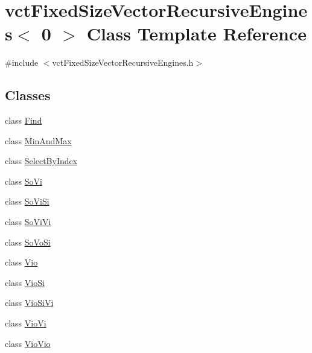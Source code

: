 \hypertarget{classvct_fixed_size_vector_recursive_engines_3_010_01_4}{\section{vct\-Fixed\-Size\-Vector\-Recursive\-Engines$<$ 0 $>$ Class Template Reference}
\label{classvct_fixed_size_vector_recursive_engines_3_010_01_4}
}


{\ttfamily \#include $<$vct\-Fixed\-Size\-Vector\-Recursive\-Engines.\-h$>$}

\subsection*{Classes}
\begin{DoxyCompactItemize}
\item 
class \hyperlink{classvct_fixed_size_vector_recursive_engines_3_010_01_4_1_1_find}{Find}
\item 
class \hyperlink{classvct_fixed_size_vector_recursive_engines_3_010_01_4_1_1_min_and_max}{Min\-And\-Max}
\item 
class \hyperlink{classvct_fixed_size_vector_recursive_engines_3_010_01_4_1_1_select_by_index}{Select\-By\-Index}
\item 
class \hyperlink{classvct_fixed_size_vector_recursive_engines_3_010_01_4_1_1_so_vi}{So\-Vi}
\item 
class \hyperlink{classvct_fixed_size_vector_recursive_engines_3_010_01_4_1_1_so_vi_si}{So\-Vi\-Si}
\item 
class \hyperlink{classvct_fixed_size_vector_recursive_engines_3_010_01_4_1_1_so_vi_vi}{So\-Vi\-Vi}
\item 
class \hyperlink{classvct_fixed_size_vector_recursive_engines_3_010_01_4_1_1_so_vo_si}{So\-Vo\-Si}
\item 
class \hyperlink{classvct_fixed_size_vector_recursive_engines_3_010_01_4_1_1_vio}{Vio}
\item 
class \hyperlink{classvct_fixed_size_vector_recursive_engines_3_010_01_4_1_1_vio_si}{Vio\-Si}
\item 
class \hyperlink{classvct_fixed_size_vector_recursive_engines_3_010_01_4_1_1_vio_si_vi}{Vio\-Si\-Vi}
\item 
class \hyperlink{classvct_fixed_size_vector_recursive_engines_3_010_01_4_1_1_vio_vi}{Vio\-Vi}
\item 
class \hyperlink{classvct_fixed_size_vector_recursive_engines_3_010_01_4_1_1_vio_vio}{Vio\-Vio}

\end{DoxyCompactItemize}
